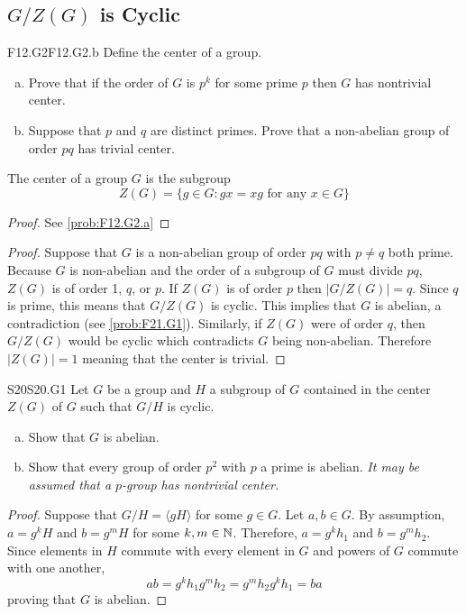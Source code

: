 \documentclass[../AlgebraQualSolutions.tex]{subfiles}
\begin{document}
\subsection{$G/Z(G)$ is Cyclic}

	\begin{prob}{F12.G2}{F12.G2.b}
	Define the center of a group.
	\begin{enumerate}[(a)]
	\item Prove that if the order of $G$ is $p^k$ for some prime $p$ then $G$ has nontrivial center.
	\item Suppose that $p$ and $q$ are distinct primes. Prove that a non-abelian group of order $pq$ has trivial center.
	\end{enumerate}
	\end{prob}
	
	The center of a group $G$ is the subgroup
		\[Z(G) = \{g \in G: gx = xg \textrm{ for any $x \in G$} \} \]
	
	\begin{proof}
		See \ref{prob:F12.G2.a}
	\end{proof}

	\begin{proof}
		Suppose that $G$ is a non-abelian group of order $pq$ with $p \neq q$ both prime. Because $G$ is non-abelian and the order of a subgroup of $G$ must divide $pq$, $Z(G)$ is of order 1, $q$, or $p$. If $Z(G)$ is of order $p$ then $|G/Z(G)| = q$. Since $q$ is prime, this means that $G/Z(G)$ is cyclic. This implies that $G$ is abelian, a contradiction (see \ref{prob:F21.G1}). Similarly, if $Z(G)$ were of order $q$, then $G/Z(G)$ would be cyclic which contradicts $G$ being non-abelian. Therefore $|Z(G)| = 1$ meaning that the center is trivial.
	\end{proof}

	\begin{prob}{S20}{S20.G1}
	Let $G$ be a group and $H$ a subgroup of $G$ contained in the center $Z(G)$ of $G$ such that $G/H$ is cyclic.
	\begin{enumerate}[(a)]
	\item Show that $G$ is abelian.
	\item Show that every group of order $p^2$ with $p$ a prime is abelian. \emph{It may be assumed that a $p$-group has nontrivial center.}
	\end{enumerate}
	\end{prob}
	
	\begin{proof}
	Suppose that $G/H = \langle gH \rangle$ for some $g \in G$. Let $a, b \in G$. By assumption, $a = g^kH$ and $b = g^mH$ for some $k,m \in \mathbb{N}$. Therefore, $a = g^kh_1$ and $b= g^m h_2$. Since elements in $H$ commute with every element in $G$ and powers of $G$ commute with one another,
		\[ab = g^kh_1g^mh_2 = g^mh_2g^k h_1 = ba \]
	proving that $G$ is abelian.
	\end{proof}
	
\end{document}
